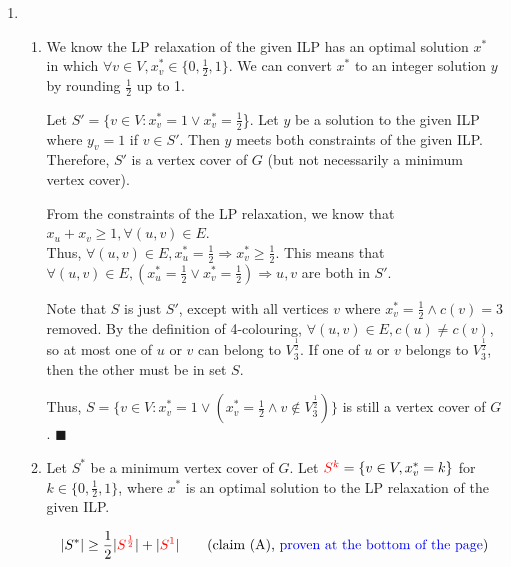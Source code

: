 \documentclass{article}
\begin{document}
\begin{enumerate}
    \item \begin{enumerate}
        \item We know the LP relaxation of the given ILP has an optimal solution $x^*$ in which $\forall v \in V, x^*_v \in \{0, \frac{1}{2}, 1\}$. We can convert $x^*$ to an integer solution $y$ by rounding $\frac{1}{2}$ up to 1. 
        
        Let $S'=\{v \in V: x^*_v = 1 \vee x^*_v = \frac{1}{2}$\}. Let $y$ be a solution to the given ILP where $y_v=1$ if $v \in S'$. Then $y$ meets both constraints of the given ILP. Therefore, $S'$ is a vertex cover of $G$ (but not necessarily a minimum vertex cover).
    
        From the constraints of the LP relaxation, we know that $x_u+x_v \geq 1, \forall (u, v) \in E$. \\Thus, $\forall (u, v) \in E, x^*_u=\frac{1}{2} \Rightarrow x^*_v \geq \frac{1}{2}$. This means that $\forall (u, v) \in E, (x^*_u=\frac{1}{2} \vee x^*_v=\frac{1}{2}) \Rightarrow u, v$ are both in $S'$.
        
        Note that $S$ is just $S'$, except with all vertices $v$ where $x^*_v=\frac{1}{2} \wedge c(v)=3$ removed. By the definition of 4-colouring, $\forall (u, v) \in E, c(u) \neq c(v)$, so at most one of $u$ or $v$ can belong to $V^{\frac{1}{2}}_3$. If one of $u$ or $v$ belongs to $V_3^{\frac{1}{2}}$, then the other must be in set $S$. 
        
        Thus, $S=\{v \in V: x^*_v=1 \vee (x^*_v=\frac{1}{2} \wedge v \not\in V^{\frac{1}{2}}_3)\}$ is still a vertex cover of $G$. \hfill $\blacksquare$
        
        \item Let $S^*$ be a minimum vertex cover of $G$. Let ${\color{red}S^k}= \{v \in V, x^*_v=k\}$ for $k \in \{0, \frac{1}{2}, 1\}$, where $x^*$ is an optimal solution to the LP relaxation of the given ILP.
        
        \begin{align*}
            |S^*| \geq \frac{1}{2}|{\color{red}S^\frac{1}{2}}| + |{\color{red}S^1}| \tag{claim (A), {\color{blue}proven at the bottom of the page}}
        \end{align*}
        

\end{enumerate}
\end{enumerate}
\end{document}
